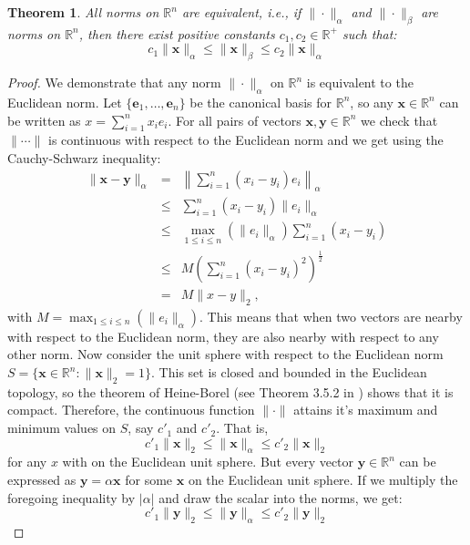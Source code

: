 \documentclass[a4paper,11pt]{report}
\newtheorem{theorem}{Theorem}[section]
\newcommand{\R}{{\mathbb R}}
\begin{document}
\begin{theorem}\label{equivalencenorms}
  All norms on $\R^n$ are \emph{equivalent}, i.e., if $\|\cdot\|_\alpha$ and 
  $\|\cdot\|_\beta$ are norms on $\R^n$, then there exist positive constants $c_1, c_2 \in 
  \R^+$ such that:
  $$c_1 \|\mathbf{x}\|_\alpha \leq \|\mathbf{x}\|_\beta \leq c_2 
  \|\mathbf{x}\|_\alpha$$
  
  \end{theorem}
\begin{proof}
  We demonstrate that any norm $\|\cdot\|_\alpha$ on $\R^n$ is equivalent to the 
  Euclidean norm. Let $\{\mathbf{e}_1,\ldots,\mathbf{e}_n\}$ be the canonical 
  basis for $\R^n$, so any $\mathbf{x} \in \R^n$ can be written as $x = \sum_{i=1}^n x_i 
  e_i$. For all pairs of vectors $\mathbf{x}, \mathbf{y} \in \R^n$ we check that $\|\cdots\|$ is continuous
  with respect to the Euclidean norm and we get using the Cauchy-Schwarz inequality:
  \begin{eqnarray*}
    \|\mathbf{x} - \mathbf{y}\|_\alpha &=& \left\|\sum_{i=1}^n (x_i - y_i)e_i 
    \right\|_\alpha\\
   &\leq& \sum_{i=1}^n (x_i - y_i)\|e_i\|_\alpha\\
   &\leq& \max_{1\leq i \leq  n}(\|e_i\|_\alpha)   \sum_{i=1}^n (x_i - y_i)\\
   &\leq& M \left( \sum_{i=1}^n (x_i - y_i)^2\right)^{\frac{1}{2}}\\
   &=& M \|x-y\|_2,
  \end{eqnarray*}
  with $M = \max_{1\leq i \leq n}(\|e_i\|_\alpha)$. This means that when two vectors
  are nearby with respect to the Euclidean norm, they are also nearby with respect
  to any other norm. Now consider the unit sphere with respect
  to the Euclidean norm $S= \{\mathbf{x} \in \R^n: \|\mathbf{x}\|_2 = 1 \}$. 
  This set is closed and bounded in the Euclidean topology, so the theorem of 
  Heine-Borel (see Theorem 3.5.2 in \cite{caenepeel}) shows that it is compact. Therefore, the continuous function $\|\cdot\|$ 
  attains it's maximum and minimum values on $S$, say $c'_1$ and $c'_2$. That is,
  $$c'_1\|\mathbf{x}\|_2 \leq \|\mathbf{x}\|_\alpha \leq c'_2\|\mathbf{x}\|_2$$
  for any $x$ with on the 
  Euclidean unit sphere. But every vector $\mathbf{y} \in \R^n$ can be 
  expressed as $\mathbf{y} = \alpha \mathbf{x}$ for some $\mathbf{x}$ on the 
  Euclidean unit sphere. If we multiply the foregoing inequality by $|\alpha|$ 
  and draw the scalar into the norms, we get:
  $$c'_1\|\mathbf{y}\|_2 \leq \|\mathbf{y}\|_\alpha \leq c'_2\|\mathbf{y}\|_2$$

\end{proof}
\end{document}
